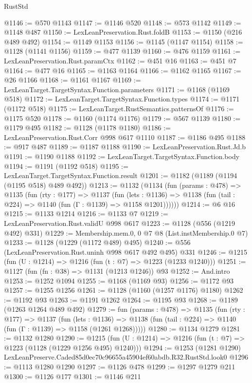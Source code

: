 \begin{lexlean}{RustStd}
\begin{coremodule}
@1146 := @570 @1143
@1147 := @1146 @520
@1148 := @573 @1142
@1149 := @1148 @487
@1150 := LexLeanPreservation.Rust.foldB
@1153 := @1150 (@216 @489 @492)
@1154 := @1149 @1153
@1156 := @1145 (@1147 @1154)
@1158 := @1128 (@1141 @1156)
@1159 := @477 @1139
@1160 := @476 @1159
@1161 := LexLeanPreservation.Rust.paramCtx
@1162 := @451 @16
@1163 := @451 @7
@1164 := @477 @16
@1165 := @1163 @1164
@1166 := @1162 @1165
@1167 := @26 @1166
@1168 := @1161 @1167
@1169 := LexLeanTarget.TargetSyntax.Function.parameters
@1171 := @1168 (@1169 @518)
@1172 := LexLeanTarget.TargetSyntax.Function.types
@1174 := @1171 (@1172 @518)
@1175 := LexLeanTarget.RustSemantics.patternsOf
@1176 := @1175 @520
@1178 := @1160 (@1174 @1176)
@1179 := @567 @1139
@1180 := @1179 @495
@1182 := @1128 (@1178 @1180)
@1186 := LexLeanPreservation.Rust.Corr @998 @617 @1110
@1187 := @1186 @495
@1188 := @917 @487
@1189 := @1187 @1188
@1190 := LexLeanPreservation.Rust.Jd.b
@1191 := @1190 @1188
@1192 := LexLeanTarget.TargetSyntax.Function.body
@1194 := @1191 (@1192 @518)
@1195 := LexLeanTarget.TargetSyntax.Function.result
@1201 := @1182 (@1189 (@1194 (@1195 @518) @489 @492))
@1213 := @1132
    (@1134
      (fun (params : @478) =>
      @1135
        (fun (rty : @177) =>
        @1137
          (fun (lets : @1136) =>
          @1138 (fun (tail : @224) => @1140 (fun (Γ : @1139) => @1158 @1201))))))
@1214 := @6 @16
@1215 := @1133 @1214
@1216 := @1133 @7
@1219 := LexLeanPreservation.Rust.validU @998 @617
@1223 := @1128 (@556 (@1219 @492) @331)
@1229 := Membership.mem.{0, 0} @7 @8 (List.instMembership.{0} @7)
@1233 := @1128 (@1229 (@1172 @489) @495)
@1240 := @556 (LexLeanPreservation.Rust.uninh @998 @617 @492 @495) @331
@1246 := @1215 (fun (U : @1214) => @1216 (fun (t : @7) => @1223 (@1233 @1240)))
@1251 := @1127 (fun (fn : @38) => @1131 (@1213 @1246)) @93
@1252 := And.intro
@1253 := @1252 @1094
@1255 := @1168 (@1169 @93)
@1256 := @1172 @93
@1257 := @1255 @1256
@1261 := @1128 (@1160 (@1257 @1176) @1180)
@1262 := @1192 @93
@1263 := @1191 @1262
@1264 := @1195 @93
@1268 := @1189 (@1263 @1264 @489 @492)
@1279 := fun (params : @478) =>
  @1135
    (fun (rty : @177) =>
    @1137
      (fun (lets : @1136) =>
      @1138 (fun (tail : @224) => @1140 (fun (Γ : @1139) => @1158 (@1261 @1268)))))
@1280 := @1134 @1279
@1281 := @1132 @1280
@1290 := @1215 (fun (U : @1214) => @1216 (fun (t : @7) => @1223 (@1128 (@1229 @1256 @495) @1240)))
@1294 := @1253 (@1281 @1290) LexLeanPreserve.Caded85d0ec70c96655a45904ef60abdb.R32.RustStd.look0
@1296 := @1113 @1280 @1290
@1297 := @1126 @478
@1299 := @1297 @1279 @211
@1300 := @1126 @177
@1301 := @1146 @211

\end{coremodule}
\end{lexlean}
